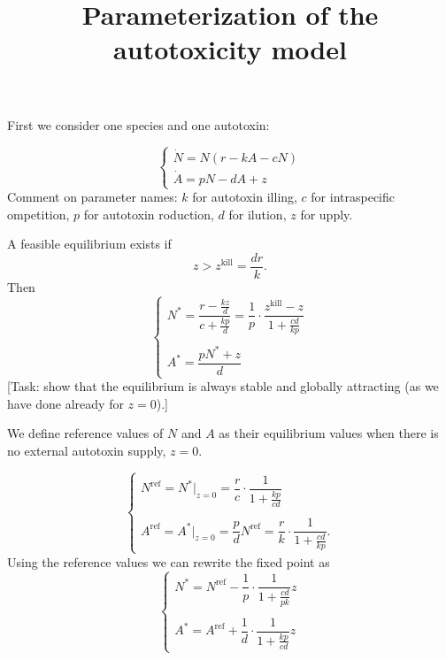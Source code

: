 \documentclass{article}
\title{Parameterization of the autotoxicity model}
\begin{document}
\maketitle

First we consider one species and one autotoxin:

\begin{equation}
\begin{cases}
    \dot{N} = N(r- k A - cN) \\
    \dot{A} = p N - d A + z
\end{cases}    
\end{equation}
Comment on parameter names: $k$ for autotoxin illing, $c$ for intraspecific ompetition, $p$ for autotoxin roduction, $d$ for ilution, $z$ for upply.   

A feasible equilibrium exists if 
\begin{equation}
    z > z^\text{kill} = \frac{dr}{k}. 
\end{equation}
Then
\begin{equation}
    \begin{cases}
        N^* = \dfrac{r - \frac{kz}{d}}{c+ \frac{kp}{d}} = \dfrac{1}{p}\cdot \dfrac{z^\text{kill} - z}{1 + \frac{cd}{kp}} \\
        \ \\
        A^* = \dfrac{p N^* + z}{d}   
    \end{cases}
\end{equation}
[Task: show that the equilibrium is always stable and globally attracting (as we have done already for $z=0$).]




We define reference values of $N$ and $A$ as their equilibrium values when there is no external autotoxin supply, $z=0$.

\begin{equation}\label{eq:ref}
    \begin{cases}        
        N^\text{ref} = N^*\big\vert_{z=0} = \dfrac{r}{c}\cdot \dfrac{1}{1 + \frac{kp}{cd}}\\
        \ \\
        A^\text{ref} = A^*\big\vert_{z=0} = \dfrac{p}{d}N^\text{ref} = \dfrac{r}{k}\cdot \dfrac{1}{1 + \frac{cd}{kp}}.
    \end{cases}
\end{equation}
Using the reference values we can rewrite the fixed point as
\begin{equation}
    \begin{cases}
        N^* = N^\text{ref} - \dfrac{1}{p} \cdot \dfrac{1}{1 + \frac{cd}{pk}} z \\
        \ \\
        A^* = A^\text{ref} +  \dfrac{1}{d}\cdot \dfrac{1}{1 + \frac{kp}{cd} } z 
    \end{cases}
\end{equation}
\end{document}
